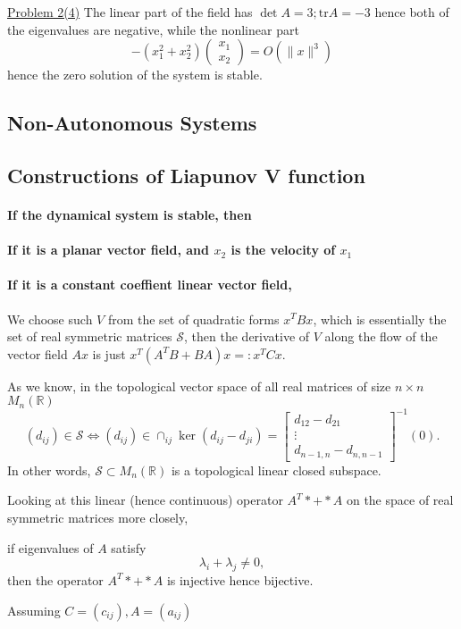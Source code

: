 \documentclass{tufte-handout}
\newcommand\n[1]{\lVert#1\rVert}
\begin{document}
\underline{Problem 2(4)}
The linear part of the field has $\det A =3; \text{tr} A=-3$ hence both of the eigenvalues are negative, while the nonlinear part 
\[ 
	-(x_1^2+x_2^2)\begin{pmatrix} 
	x_1 \\
	x_2
	\end{pmatrix}=O(\n{x}^3)
\]
hence the zero solution of the system is stable.
\subsection{Non-Autonomous Systems}
\cite{2001}
\subsection{Constructions of Liapunov V function}

\paragraph{If the dynamical system is stable, then }
\paragraph{If it is a planar vector field, and $x_2$ is the velocity of $x_1$}
\paragraph{If it is a constant coeffient linear vector field,}
We choose such $V$ from the set of quadratic forms ${x^T B x}$, which is essentially the set of real symmetric matrices $\mathscr{S}$, then the derivative of $V$ along the flow of the vector field ${Ax}$ is just $x^T (A^T B+ BA)x=: x^TCx$. 

As we know, in the topological vector space of all real matrices of size $n\times n$ $M_n(\mathbb{R})$ \[ (d_{ij})\in \mathscr{S} \iff (d_{ij}) \in \cap_{ij} \ker(d_{ij} - d_{ji}) =
\begin{bmatrix}
	d_{12} - d_{21} \\
	\vdots \\
	d_{n-1,n} - d_{n,n-1}
\end{bmatrix} 
^{-1}
(0).
\]
In other words, $\mathscr{S} \subset M_n(\mathbb{R})$ is a topological linear closed subspace.

Looking at this linear (hence continuous) operator $A^T * + * A$ on the space of real symmetric matrices more closely, 

\begin{lemma}\label{lemma:isolinear} if eigenvalues of $A$ satisfy \[ \lambda_i + \lambda_j \neq 0, \]
then the operator $A^T * + * A$ is injective hence bijective.
\end{lemma}
Assuming $C=(c_{ij}), A=(a_{ij})$
\end{document}
